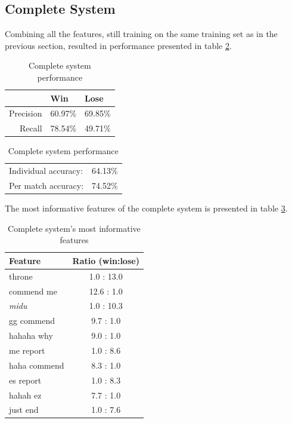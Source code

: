 \documentclass[12pt,a4paper]{article}
\begin{document}
\subsection{Complete System}
Combining all the features, still training on the same training set as in the previous section,
resulted in performance presented in table \ref{tab:complete}.


\begin{table}[h]
    \begin{center}
\begin{tabular}{ r | l l }
                & Win       & Lose \\
    \hline
    Precision   & 60.97\%   & 69.85\% \\
    Recall      & 78.54\%   & 49.71\% \\
    
\end{tabular}

\rule{0pt}{8ex}    
\begin{tabular}{ l l }
    Individual accuracy: & 64.13\% \\
    Per match accuracy:  & 74.52\%\\
\end{tabular}
\caption{Complete system performance}
\label{tab:complete}
\end{center}
\end{table}

The most informative features of the complete system is presented in table \ref{tab:completefeats}.
\begin{table}[h]
    \begin{center}
        \begin{tabular}{l | c}
            Feature          & Ratio (win:lose) \\ \hline
            throne           & 1.0 : 13.0 \\
            commend me       & 12.6 : 1.0 \\
            \textit{midu}    & 1.0 : 10.3 \\
            gg commend       & 9.7 : 1.0 \\
            hahaha why       & 9.0 : 1.0 \\
            me report        & 1.0 : 8.6 \\
            haha commend     & 8.3 : 1.0 \\
            es report        & 1.0 : 8.3 \\
            hahah ez         & 7.7 : 1.0 \\
            just end         & 1.0 : 7.6 \\
        \end{tabular}
        \caption{Complete system's most informative features}
        \label{tab:completefeats}
    \end{center}
\end{table}
\end{document}
